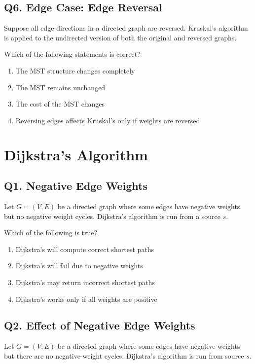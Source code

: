 \subsection*{Q6. Edge Case: Edge Reversal}
Suppose all edge directions in a directed graph are reversed. Kruskal's algorithm is applied to the undirected version of both the original and reversed graphs.

Which of the following statements is correct?

\begin{enumerate}[label=(\alph*)]
    \item The MST structure changes completely
    \item The MST remains unchanged
    \item The cost of the MST changes
    \item Reversing edges affects Kruskal’s only if weights are reversed
\end{enumerate}

\newpage
\section{Dijkstra's Algorithm}
\subsection*{Q1. Negative Edge Weights}
Let $G = (V, E)$ be a directed graph where some edges have negative weights but no negative weight cycles. Dijkstra’s algorithm is run from a source $s$.

Which of the following is true?

\begin{enumerate}[label=(\alph*)]
    \item Dijkstra’s will compute correct shortest paths
    \item Dijkstra’s will fail due to negative weights
    \item Dijkstra’s may return incorrect shortest paths
    \item Dijkstra’s works only if all weights are positive
\end{enumerate}

\subsection*{Q2. Effect of Negative Edge Weights}
Let $G = (V, E)$ be a directed graph where some edges have negative weights but there are no negative-weight cycles. Dijkstra's algorithm is run from source $s$.

